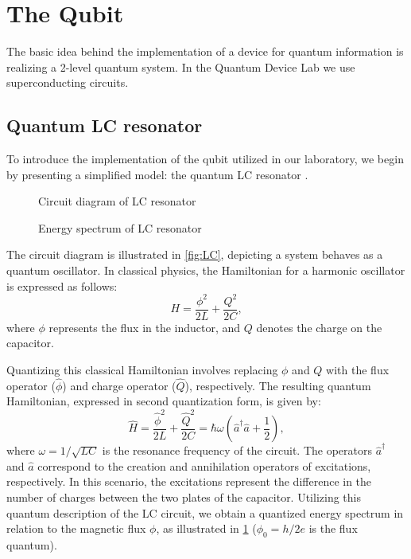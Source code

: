 \section{The Qubit}
\label{sec:qubit}

The basic idea behind the implementation of a device for quantum information is realizing a 2-level quantum system.
In the Quantum Device Lab we use superconducting circuits.

\subsection{Quantum LC resonator}

To introduce the implementation of the qubit utilized in our laboratory, we begin by presenting a simplified model: the quantum LC resonator \cite{LC_resonator}.
\begin{figure}
    \begin{minipage}[b]{0.5\linewidth}
      \centering
        
        \vspace{-0.7cm}
        \caption{Circuit diagram of LC resonator}
        \label{fig:LC}
    \end{minipage}
    \hfill
    \begin{minipage}[b]{0.45\linewidth}
      \centering
      
      \vspace{-1.5cm}
      \caption{Energy spectrum of LC resonator}
      \label{fig:Energy_spectrum}
    \end{minipage}
  \end{figure}
The circuit diagram is illustrated in \cref{fig:LC}, depicting a system behaves as a quantum oscillator.
In classical physics, the Hamiltonian for a harmonic oscillator is expressed as follows:
\begin{equation}
    H = \frac{\phi^2}{2L} + \frac{Q^2}{2C},
\end{equation}
where $\phi$ represents the flux in the inductor, and $Q$ denotes the charge on the capacitor.

Quantizing this classical Hamiltonian involves replacing $\phi$ and $Q$ with the flux operator ($\hat{\phi}$) and charge operator ($\hat{Q}$), respectively.
The resulting quantum Hamiltonian, expressed in second quantization form, is given by:
\begin{equation}
    \hat{H} = \frac{\hat{\phi}^2}{2L} + \frac{\hat{Q}^2}{2C} = \hbar \omega \left(\hat{a}^\dagger \hat{a} + \frac{1}{2}\right),
\end{equation}
where $\omega = 1/\sqrt{LC}$ is the resonance frequency of the circuit.
The operators $\hat{a}^\dagger$ and $\hat{a}$ correspond to the creation and annihilation operators of excitations, respectively. 
In this scenario, the excitations represent the difference in the number of charges between the two plates of the capacitor.
Utilizing this quantum description of the LC circuit, we obtain a quantized energy spectrum in relation to the magnetic flux $\phi$, as illustrated in \cref{fig:Energy_spectrum} ($\phi_0 = h/2e$ is the flux quantum).

